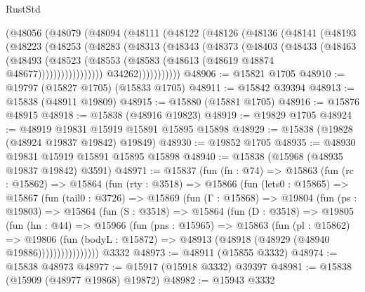 \begin{lexlean}{RustStd}
\begin{coremodule}
            (@48056
              (@48079
                (@48094
                  (@48111
                    (@48122
                      (@48126
                        (@48136
                          (@48141
                            (@48193
                              (@48223
                                (@48253
                                  (@48283
                                    (@48313
                                      (@48343
                                        (@48373
                                          (@48403
                                            (@48433
                                              (@48463
                                                (@48493
                                                  (@48523
                                                    (@48553
                                                      (@48583
                                                        (@48613
                                                          (@48619 @48874 @48677)))))))))))))))))
                          @34262)))))))))))
@48906 := @15821 @1705
@48910 := @19797 (@15827 @1705) (@15833 @1705)
@48911 := @15842 @39394
@48913 := @15838 (@48911 @19809)
@48915 := @15880 (@15881 @1705)
@48916 := @15876 @48915
@48918 := @15838 (@48916 @19823)
@48919 := @19829 @1705
@48924 := @48919 @19831 @15919 @15891 @15895 @15898
@48929 := @15838 (@19828 (@48924 @19837 @19842) @19849)
@48930 := @19852 @1705
@48935 := @48930 @19831 @15919 @15891 @15895 @15898
@48940 := @15838 (@15968 (@48935 @19837 @19842) @3591)
@48971 := @15837
    (fun (fn : @74) =>
    @15863
      (fun (rc : @15862) =>
      @15864
        (fun (rty : @3518) =>
        @15866
          (fun (lets0 : @15865) =>
          @15867
            (fun (tail0 : @3726) =>
            @15869
              (fun (Γ : @15868) =>
              @19804
                (fun (ps : @19803) =>
                @15864
                  (fun (S : @3518) =>
                  @15864
                    (fun (D : @3518) =>
                    @19805
                      (fun (hn : @44) =>
                      @15966
                        (fun (pns : @15965) =>
                        @15863
                          (fun (pl : @15862) =>
                          @19806
                            (fun (bodyL : @15872) =>
                            @48913 (@48918 (@48929 (@48940 @19886))))))))))))))))
    @3332
@48973 := @48911 (@15855 @3332)
@48974 := @15838 @48973
@48977 := @15917 (@15918 @3332) @39397
@48981 := @15838 (@15909 (@48977 @19868) @19872)
@48982 := @15943 @3332

\end{coremodule}
\end{lexlean}
